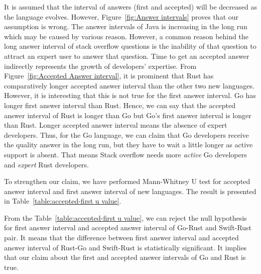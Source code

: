 It is assumed that the interval of answers (first and accepted) will be decreased as the language evolves. However, Figure~\ref{fig:Answer intervals} proves that our assumption is wrong. The answer intervals of Java is increasing in the long run which may be caused by various reason. However, a common reason behind the long answer interval of  stack overflow questions is the inability of that question to attract an expert user to answer that question\citep{Asaduzzaman2013}.
Time to get an accepted answer indirectly represents the growth of developers' expertise. From Figure~\ref{fig:Accepted Answer interval}, it is prominent that Rust has comparatively longer accepted answer interval than the other two new languages. However, it is interesting that this is not true for the first answer interval. Go has longer first answer interval than Rust. Hence, we can say that the accepted answer interval of Rust is longer than Go but Go's first answer interval is longer than Rust. Longer accepted answer interval means the absence of expert developers. Thus, for the Go language, we can claim that Go developers receive the quality answer in the long run, but they have to wait a little longer as active support is absent. That means Stack overflow needs more \emph{active} Go developers and \emph{expert} Rust developers.


To strengthen our claim, we have performed Mann-Whitney U test for accepted answer interval and first answer interval of new languages. The result is presented in Table~\ref{table:accepted-first u value}.

From the Table~\ref{table:accepted-first u value}, we can reject the null hypothesis for first answer interval and accepted answer interval of Go-Rust and Swift-Rust pair. It means that the difference between first answer interval and accepted answer interval of Rust-Go and Swift-Rust is statistically significant. It implies that our claim about the first and accepted answer intervals of Go and Rust is true.


